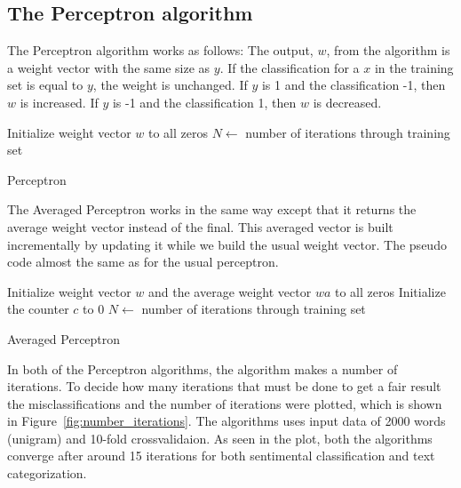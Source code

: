 \subsection{The Perceptron algorithm}
The Perceptron algorithm works as follows:
The output, $w$, from the algorithm is a weight vector with the same size as $y$. If the classification for a $x$ in the training set is equal to $y$, the weight is unchanged.
If $y$ is 1 and the classification -1, then $w$ is increased. If $y$ is -1 and the classification 1, then $w$ is decreased. \citep{perceptron_ai}
\begin{algorithm}[h!]
\label{algorithm:perceptron}
 \SetAlgoLined
 Initialize weight vector $w$ to all zeros\;
 $N \leftarrow$ number of iterations through training set\;
 \caption{Perceptron}
\end{algorithm}
The Averaged Perceptron works in the same way except that it returns the average weight vector instead of the final.
This averaged vector is built incrementally by updating it while we build the usual weight vector. The pseudo code almost the same as for the usual perceptron.
\begin{algorithm}[h!]
\label{algorithm:perceptron}
 \SetAlgoLined
 Initialize weight vector $w$ and the average weight vector $wa$ to all zeros\;
 Initialize the counter $c$ to 0\;
 $N \leftarrow$ number of iterations through training set\;
 \caption{Averaged Perceptron}
\end{algorithm}
In both of the Perceptron algorithms, the algorithm makes a number of iterations. To decide how many iterations that must be done to get a fair result the misclassifications and the number of iterations were plotted, which is shown in Figure~\ref{fig:number_iterations}. The algorithms uses input data of 2000 words (unigram) and 10-fold crossvalidaion. As seen in the plot, both the algorithms converge after around 15 iterations for both sentimental classification and text categorization.
